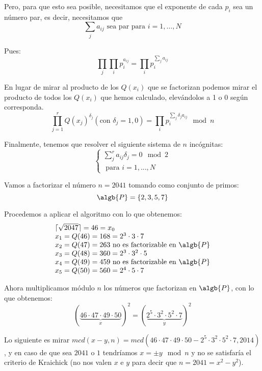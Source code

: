 \begin{mdframed}
Pero, para que esto sea posible, necesitamos que el exponente de cada $p_i$ sea un número par, es decir, necesitamos que
\[\sum_ja_{ij} \text{ sea par para } i={1,…,N}\]

Pues:
\[\prod_j\prod_ip_i^{a_{ij}} = \prod_i p_i^{\sum_ja_{ij}}\]

En lugar de mirar al producto de los $Q(x_i)$ que se factorizan podemos mirar el producto de todos los $Q(x_i)$ que hemos calculado, elevándolos a 1 o 0 según corresponda.
\[\prod_{j=1}^r Q(x_j)^{δ_j} (\text{con } δ_j = 1,0)  = \prod_ip_i^{\sum_jδ_ja_{ij}} \mod n\]

Finalmente, tenemos que resolver el siguiente sistema de $n$ incógnitas:
\[\left\{ \begin{array}{l}
\sum_j^ra_{ij}δ_j = 0 \mod 2 \\
\text{ para } i=1,...,N
\end{array}\right.\]
\end{mdframed}

\begin{example}
Vamos a factorizar el número $n=2041$ tomando como conjunto de primos:
\[\algb{P} = \{ 2,3,5,7\}\]

Procedemos a aplicar el algoritmo con lo que obtenemos:
\[\begin{array}{l}
\lceil\sqrt{2047}\rceil = 46=x_0 \\
x_1 = Q(46)=168=2^3\cdot 3 \cdot 7 \\
x_2 = Q(47) = 263 \text{ no es factorizable en }\algb{P}\\
x_3 = Q(48) = 360 = 2^3\cdot 3^2 \cdot 5 \\
x_4 = Q(49) = 459 \text{ no es factorizable en }\algb{P}\\
x_5 = Q(50) = 560 = 2^4\cdot 5 \cdot 7
\end{array}\]

Ahora multiplicamos módulo $n$ los números que factorizan en $\algb{P}$, con lo que obtenemos:
\[(\underbrace{46\cdot 47 \cdot 49 \cdot 50}_{x})^2 = (\underbrace{2^5\cdot 3^2 \cdot 5^2 \cdot 7}_y)^2\]

Lo siguiente es mirar $mcd(x-y, n)=mcd(46\cdot 47 \cdot 49 \cdot 50 - 2^5\cdot 3^2 \cdot 5^2 \cdot 7, 2014)$, y en caso de que sea $2041$ o $1$ tendríamos $x=\pm y \mod n$ y no se satisfaría el criterio de Kraichick (no nos valen $x$ e $y$ para decir que $n=2041=x^2-y^2$).
\end{example}
